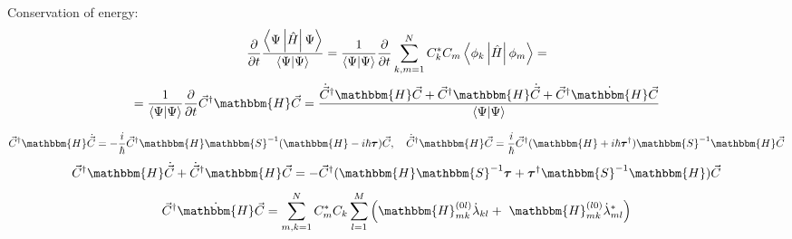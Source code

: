 \begin{frame}{}
\begin{block}{Conservation of energy:}
$$\frac{\partial}{\partial t}\frac{\mymean{\Psi}{\hat{H}}{\Psi}}{\myel{\Psi}{\Psi}} = %
  \frac{1}{\myel{\Psi}{\Psi}}\frac{\partial}{\partial t}\sum_{k,m=1}^NC_k^*C_m\mymean{\phi_k}{\hat{H}}{\phi_m} = $$
$$=\frac{1}{\myel{\Psi}{\Psi}}\frac{\partial}{\partial t}\vec{C}^{\dagger}\mathbbm{H}\vec{C}=%
  \frac{\dot{\vec{C}}^{\dagger}\mathbbm{H}\vec{C}+\vec{C}^{\dagger}\mathbbm{H}\dot{\vec{C}} + \vec{C}^{\dagger}\dot{\mathbbm{H}}\vec{C}}{\myel{\Psi}{\Psi}}$$
\end{block}
$$\vec{C}^{\dagger}\mathbbm{H}\dot{\vec{C}} = -\frac{i}{\hbar}\vec{C}^{\dagger}\mathbbm{H}\mathbbm{S}^{-1}(\mathbbm{H}-i\hbar\boldsymbol{\tau})\vec{C},\quad%
\dot{\vec{C}}^{\dagger}\mathbbm{H}\vec{C} = \frac{i}{\hbar}\vec{C}^\dagger(\mathbbm{H}+i\hbar\boldsymbol{\tau}^{\dagger})\mathbbm{S}^{-1}\mathbbm{H}\vec{C}$$
$$\vec{C}^{\dagger}\mathbbm{H}\dot{\vec{C}}+\dot{\vec{C}}^{\dagger}\mathbbm{H}\vec{C} = %
 -\vec{C}^{\dagger}(\mathbbm{H}\mathbbm{S}^{-1}\boldsymbol{\tau} + \boldsymbol{\tau}^{\dagger}\mathbbm{S}^{-1}\mathbbm{H})\vec{C}$$
$$\vec{C}^{\dagger}\dot{\mathbbm{H}}\vec{C} = \sum_{m,k=1}^NC_m^*C_k%
					      \sum_{l=1}^M\left(\mathbbm{H}_{mk}^{(0l)}\dot{\lambda}_{kl}+\
								\mathbbm{H}_{mk}^{(l0)}\dot{\lambda}_{ml}^*\right)$$
\end{frame}

